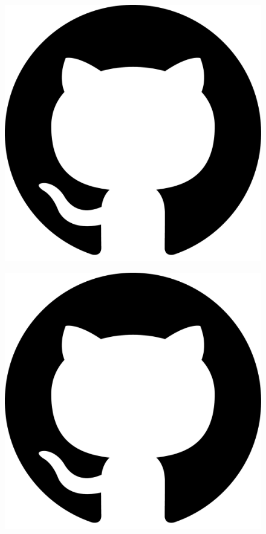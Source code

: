 

\begin{figure}[th!]
\includegraphics[width=\textwidth]{./sponsors/github.pdf}
\end{figure}

\begin{figure}[H]
\includegraphics[width=\textwidth, trim=3cm 1cm 2.5cm 1.5cm, clip=true]{./sponsors/github.pdf}
\end{figure}


